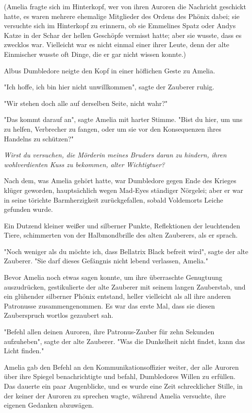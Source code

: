 {(Amelia fragte sich im Hinterkopf, wer von ihren Auroren die Nachricht geschickt hatte, es waren mehrere ehemalige Mitglieder des Ordens des Phönix dabei; sie versuchte sich im Hinterkopf zu erinnern, ob sie Emmelines Spatz oder Andys Katze in der Schar der hellen Geschöpfe vermisst hatte; aber sie wusste, dass es zwecklos war. Vielleicht war es nicht einmal einer ihrer Leute, denn der alte Einmischer wusste oft Dinge, die er gar nicht wissen konnte.)

Albus Dumbledore neigte den Kopf in einer höflichen Geste zu Amelia.

"Ich hoffe, ich bin hier nicht unwillkommen", sagte der Zauberer ruhig.

"Wir stehen doch alle auf derselben Seite, nicht wahr?"

"Das kommt darauf an", sagte Amelia mit harter Stimme. "Bist du hier, um uns zu helfen, Verbrecher zu fangen, oder um sie vor den Konsequenzen ihres Handelns zu schützen?"

\emph{Wirst du versuchen, die Mörderin meines Bruders daran zu hindern, ihren wohlverdienten Kuss zu bekommen, alter Wichtigtuer?}

Nach dem, was Amelia gehört hatte, war Dumbledore gegen Ende des Krieges klüger geworden, hauptsächlich wegen Mad-Eyes ständiger Nörgelei; aber er war in seine törichte Barmherzigkeit zurückgefallen, sobald Voldemorts Leiche gefunden wurde.

Ein Dutzend kleiner weißer und silberner Punkte, Reflektionen der leuchtenden Tiere, schimmerten von der Halbmondbrille des alten Zauberers, als er sprach.

"Noch weniger als du möchte ich, dass Bellatrix Black befreit wird", sagte der alte Zauberer. "Sie darf dieses Gefängnis nicht lebend verlassen, Amelia."

Bevor Amelia noch etwas sagen konnte, um ihre überraschte Genugtuung auszudrücken, gestikulierte der alte Zauberer mit seinem langen Zauberstab, und ein glühender silberner Phönix entstand, heller vielleicht als all ihre anderen Patronusse zusammengenommen. Es war das erste Mal, dass sie diesen Zauberspruch wortlos gezaubert sah.

"Befehl allen deinen Auroren, ihre Patronus-Zauber für zehn Sekunden aufzuheben", sagte der alte Zauberer. "Was die Dunkelheit nicht findet, kann das Licht finden."

Amelia gab den Befehl an den Kommunikationsoffizier weiter, der alle Auroren über ihre Spiegel benachrichtigte und befahl, Dumbledores Willen zu erfüllen. Das dauerte ein paar Augenblicke, und es wurde eine Zeit schrecklicher Stille, in der keiner der Auroren zu sprechen wagte, während Amelia versuchte, ihre eigenen Gedanken abzuwägen.

}
